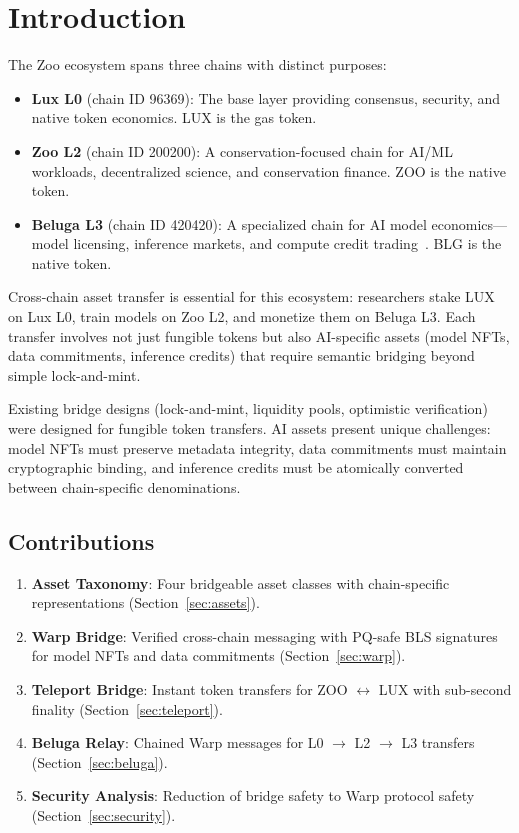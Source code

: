 \section{Introduction}


The Zoo ecosystem spans three chains with distinct purposes:

\begin{itemize}
    \item \textbf{Lux L0} (chain ID 96369): The base layer providing consensus, security, and native token economics. LUX is the gas token.

    \item \textbf{Zoo L2} (chain ID 200200): A conservation-focused chain for AI/ML workloads, decentralized science, and conservation finance. ZOO is the native token.

    \item \textbf{Beluga L3} (chain ID 420420): A specialized chain for AI model economics---model licensing, inference markets, and compute credit trading~\cite{beluga-l3-whitepaper}. BLG is the native token.
\end{itemize}

Cross-chain asset transfer is essential for this ecosystem: researchers stake LUX on Lux L0, train models on Zoo L2, and monetize them on Beluga L3. Each transfer involves not just fungible tokens but also AI-specific assets (model NFTs, data commitments, inference credits) that require semantic bridging beyond simple lock-and-mint.

Existing bridge designs (lock-and-mint, liquidity pools, optimistic verification) were designed for fungible token transfers. AI assets present unique challenges: model NFTs must preserve metadata integrity, data commitments must maintain cryptographic binding, and inference credits must be atomically converted between chain-specific denominations.

\subsection{Contributions}

\begin{enumerate}
    \item \textbf{Asset Taxonomy}: Four bridgeable asset classes with chain-specific representations (Section~\ref{sec:assets}).

    \item \textbf{Warp Bridge}: Verified cross-chain messaging with PQ-safe BLS signatures for model NFTs and data commitments (Section~\ref{sec:warp}).

    \item \textbf{Teleport Bridge}: Instant token transfers for ZOO $\leftrightarrow$ LUX with sub-second finality (Section~\ref{sec:teleport}).

    \item \textbf{Beluga Relay}: Chained Warp messages for L0 $\to$ L2 $\to$ L3 transfers (Section~\ref{sec:beluga}).

    \item \textbf{Security Analysis}: Reduction of bridge safety to Warp protocol safety (Section~\ref{sec:security}).
\end{enumerate}

